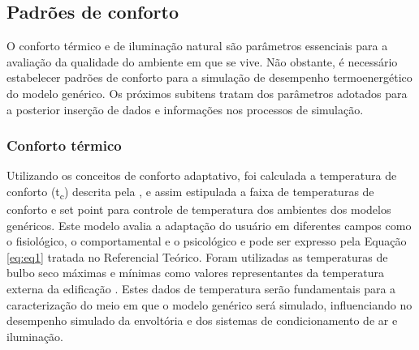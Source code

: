 \subsection{Padrões de conforto}
O conforto térmico e de iluminação natural são parâmetros essenciais para a avaliação da qualidade do ambiente em que se vive. Não obstante, é necessário estabelecer padrões de conforto para a simulação de desempenho termoenergético do modelo genérico. Os próximos subitens tratam dos parâmetros adotados para a posterior inserção de dados e informações nos processos de simulação.
\subsubsection{Conforto térmico}
Utilizando os conceitos de conforto adaptativo, foi calculada a temperatura de conforto (t\textsubscript{c}) descrita pela \textcite{AmericanSocietyofHeatingRefrigeratingandAir-ConditioningEngineers-ASHRAE2017}, e assim estipulada a faixa de temperaturas de conforto e set point para controle de temperatura dos ambientes dos modelos genéricos. Este modelo avalia a adaptação do usuário em diferentes campos como o fisiológico, o comportamental e o psicológico \cite{AmericanSocietyofHeatingRefrigeratingandAir-ConditioningEngineers-ASHRAE2017a} e pode ser expresso pela Equação \ref{eq:eq1} tratada no Referencial Teórico.\vspace*{0.3cm} \newline
Foram utilizadas as temperaturas de bulbo seco máximas e mínimas como valores representantes da temperatura externa da edificação \cite{InstitutoNacionaldeMetereologia-INMET2018}. Estes dados de temperatura serão fundamentais para a caracterização do meio em que o modelo genérico será simulado, influenciando no desempenho simulado da envoltória e dos sistemas de condicionamento de ar e iluminação.
